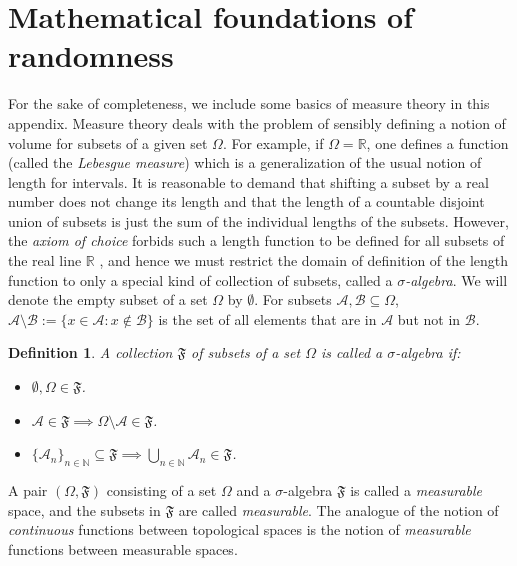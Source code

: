 \documentclass[a4paper,onecolumn,10pt,accepted=2022-07-11]{quantumarticle}
\newtheorem{definition}[theorem]{Definition}
\theoremstyle{definition}
\begin{document}
\section{Mathematical foundations of randomness}\label{appen:measure}
For the sake of completeness, we include some basics of measure theory in this appendix. Measure theory deals with the problem of sensibly defining a notion of volume for subsets of a given set $\Omega$. For example, if $\Omega=\mathbb{R}$, one defines a function (called the \emph{Lebesgue measure}) which is a generalization of the usual notion of length for intervals. It is reasonable to demand that shifting a subset by a real number does not change its length and that the length of a countable disjoint union of subsets is just the sum of the individual lengths of the subsets. However, the \emph{axiom of choice} forbids such a length function to be defined for all subsets of the real line $\mathbb{R}$ \cite[Section 16]{halmos1976measure}, and hence we must restrict the domain of definition of the length function to only a special kind of collection of subsets, called a $\sigma$\emph{-algebra}. We will denote the empty subset of a set $\Omega$ by $\emptyset$. For subsets $\mathcal{A},\mathcal{B}\subseteq \Omega$, $\mathcal{A}\setminus \mathcal{B} := \{x\in \mathcal{A} : x\notin \mathcal{B} \}$ is the set of all elements that are in $\mathcal{A}$ but not in $\mathcal{B}$.

\begin{definition}
A collection $\mathfrak{F}$ of subsets of a set $\Omega$ is called a $\sigma$-\emph{algebra} if:
\begin{itemize}
    \item $\emptyset, \Omega \in \mathfrak{F}$.
    \item $\mathcal{A}\in \mathfrak{F}\implies \Omega\setminus \mathcal{A}\in \mathfrak{F}$.
    \item $\{\mathcal{A}_n\}_{n\in \mathbb{N}}\subseteq \mathfrak{F} \implies \bigcup_{n\in \mathbb{N}}\mathcal{A}_n \in \mathfrak{F}$.
\end{itemize}
\end{definition}

A pair $(\Omega,\mathfrak{F})$ consisting of a set $\Omega$ and a $\sigma$-algebra $\mathfrak{F}$ is called a \emph{measurable} space, and the subsets in $\mathfrak{F}$ are called \emph{measurable}. The analogue of the notion of \emph{continuous} functions between topological spaces is the notion of \emph{measurable} functions between measurable spaces. 
\end{document}
